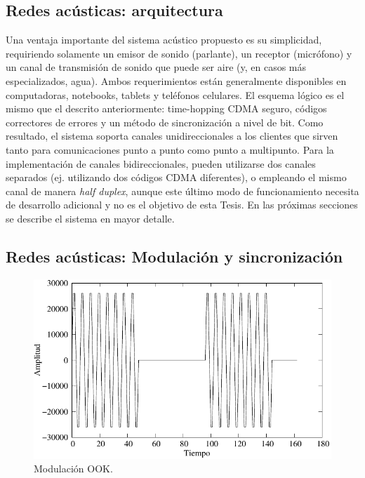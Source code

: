 \subsection{Redes acústicas: arquitectura}

Una ventaja importante del sistema acústico propuesto es su simplicidad, requiriendo solamente un emisor de sonido (parlante), un receptor (micrófono) y un canal de transmisión de sonido que puede ser aire (y, en casos más especializados, agua). Ambos requerimientos están generalmente disponibles en computadoras, notebooks, tablets y teléfonos celulares. 
El esquema lógico es el mismo que el descrito anteriormente: time-hopping CDMA seguro, códigos correctores de errores y un método de sincronización a nivel de bit.
Como resultado, el sistema soporta canales unidireccionales a los clientes que sirven tanto para comunicaciones punto a punto como punto a multipunto. 
Para la implementación de canales bidireccionales, pueden utilizarse dos canales separados (ej. utilizando dos códigos CDMA diferentes), o empleando el mismo canal de manera \textit{half duplex}, aunque este último modo de funcionamiento necesita de desarrollo adicional y no es el objetivo de esta Tesis.
En las próximas secciones se describe el sistema en mayor detalle.

\subsection{Redes acústicas: Modulación y sincronización}
\begin{figure}[t]
  \centering
    \includegraphics[width=5in]{graphs/modulated.pdf}
    \caption{Modulación OOK.}
    \label{arch:ook}
\end{figure}


